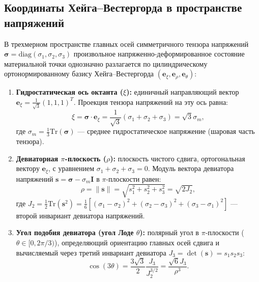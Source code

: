 \documentclass[12pt,a4paper]{article}
\begin{document}
	\subsection{Координаты Хейга--Вестергорда в пространстве напряжений}
	В трехмерном пространстве главных осей симметричного тензора напряжений $\boldsymbol{\sigma} = \mathrm{diag}(\sigma_1, \sigma_2, \sigma_3)$ произвольное напряженно-деформированное состояние материальной точки однозначно разлагается по цилиндрическому ортонормированному базису Хейга--Вестергорда $(\mathbf{e}_\xi, \mathbf{e}_\rho, \mathbf{e}_\theta)$:
	\begin{enumerate}
		\item \textbf{Гидростатическая ось октанта ($\xi$):} единичный направляющий вектор $\mathbf{e}_\xi = \frac{1}{\sqrt{3}}(1, 1, 1)^T$. Проекция тензора напряжений на эту ось равна:
		\begin{equation}
			\xi = \boldsymbol{\sigma} \cdot \mathbf{e}_\xi = \frac{1}{\sqrt{3}}(\sigma_1 + \sigma_2 + \sigma_3) = \sqrt{3}\sigma_m,
		\end{equation}
		где $\sigma_m = \frac{1}{3}\mathrm{Tr}(\boldsymbol{\sigma})$ --- среднее гидростатическое напряжение (шаровая часть тензора).
		
		\item \textbf{Девиаторная $\pi$-плоскость ($\rho$):} плоскость чистого сдвига, ортогональная вектору $\mathbf{e}_\xi$, с уравнением $\sigma_1 + \sigma_2 + \sigma_3 = 0$. Модуль вектора девиатора напряжений $\mathbf{s} = \boldsymbol{\sigma} - \sigma_m \mathbf{I}$ в $\pi$-плоскости равен:
		\begin{equation}
			\rho = \|\mathbf{s}\| = \sqrt{s_1^2 + s_2^2 + s_3^2} = \sqrt{2 J_2},
		\end{equation}
		где $J_2 = \frac{1}{2}\mathrm{Tr}(\mathbf{s}^2) = \frac{1}{6}\left[ (\sigma_1 - \sigma_2)^2 + (\sigma_2 - \sigma_3)^2 + (\sigma_3 - \sigma_1)^2 \right]$ --- второй инвариант девиатора напряжений.
		
		\item \textbf{Угол подобия девиатора (угол Лоде $\theta$):} полярный угол в $\pi$-плоскости ($\theta \in [0, 2\pi/3)$), определяющий ориентацию главных осей сдвига и вычисляемый через третий инвариант девиатора $J_3 = \det(\mathbf{s}) = s_1 s_2 s_3$:
		\begin{equation}
			\cos(3\theta) = \frac{3\sqrt{3}}{2} \frac{J_3}{J_2^{3/2}} = \frac{\sqrt{6} J_3}{\rho^3}.
		\end{equation}
	\end{enumerate}
	
\end{document}
